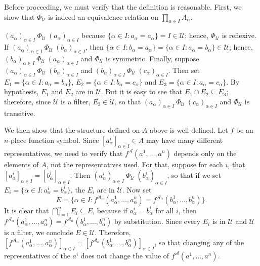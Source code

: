 \documentclass{article}
\def\A{\mathcal A}
\def\U{\mathscr U}
\begin{document}
\noindent Before proceeding, we must verify that the definition is reasonable.  First, we show that $\Phi_\U$ is indeed an equivalence relation on $\prod_{\alpha\in I}A_\alpha$.

$(a_\alpha)_{\alpha\in I}~\Phi_\U~(a_\alpha)_{\alpha\in I}$ because $\{\alpha\in I:a_\alpha=a_\alpha\}=I\in\U$; hence, $\Phi_\U$ is reflexive.  If $(a_\alpha)_{\alpha\in I}~\Phi_\U~(b_\alpha)_{\alpha\in I}$, then $\{\alpha\in I:b_\alpha=a_\alpha\}=\{\alpha\in I:a_\alpha=b_\alpha\}\in\U$; hence, $(b_\alpha)_{\alpha\in I}~\Phi_\U~(a_\alpha)_{\alpha\in I}$ and $\Phi_\U$ is symmetric.  Finally, suppose $(a_\alpha)_{\alpha\in I}~\Phi_\U~(b_\alpha)_{\alpha\in I}$ and $(b_\alpha)_{\alpha\in I}~\Phi_\U~(c_\alpha)_{\alpha\in I}$.  Then set $E_1=\{\alpha\in I:a_\alpha=b_\alpha\}$, $E_2=\{\alpha\in I:b_\alpha=c_\alpha\}$ and $E_3=\{\alpha\in I:a_\alpha=c_\alpha\}$.  By hypothesis, $E_1$ and $E_2$ are in $\U$.  But it is easy to see that $E_1\cap E_2\subseteq E_3$; therefore, since $\U$ is a filter, $E_3\in\U$, so that $(a_\alpha)_{\alpha\in I}~\Phi_\U~(c_\alpha)_{\alpha\in I}$ and $\Phi_\U$ is transitive.

We then show that the structure defined on $A$ above is well defined.  Let $f$ be an $n$-place function symbol.  Since $[a^i_\alpha]_{\alpha\in I}\in A$ may have many different representatives, we need to verify that $f^\A(a^1,\dots,a^n)$ depends only on the elements of $A$, not the representatives used.  For that, suppose for each $i$, that $[a^i_\alpha]_{\alpha\in I}=[b^i_\alpha]_{\alpha\in I}$.  Then $(a^i_\alpha)_{\alpha\in I}~\Phi_\U~(b^i_\alpha)_{\alpha\in I}$, so that if we set $E_i=\{\alpha\in I:a^i_\alpha=b^i_\alpha\}$, the $E_i$ are in $\U$.  Now set
$$E=\{\alpha\in I:f^{\A_\alpha}(a^1_\alpha,\dots,a^n_\alpha)=f^{\A_\alpha}(b^1_\alpha,\dots,b^n_\alpha)\}.$$
It is clear that $\bigcap_{i=1}^nE_i\subseteq E$, because if $a^i_\alpha=b^i_\alpha$ for all $i$, then $f^{\A_\alpha}(a^1_\alpha,\dots,a^n_\alpha)=f^{\A_\alpha}(b^1_\alpha,\dots,b^n_\alpha)$ by substitution.  Since every $E_i$ is in $\U$ and $\U$ is a filter, we conclude $E\in\U$.  Therefore, $[f^{\A_\alpha}(a^1_\alpha,\dots,a^n_\alpha)]_{\alpha\in I}=[f^{\A_\alpha}(b^1_\alpha,\dots,b^n_\alpha)]_{\alpha\in I}$, so that changing any of the representatives of the $a^i$ does not change the value of $f^\A(a^1,\dots,a^n)$.
\end{document}
